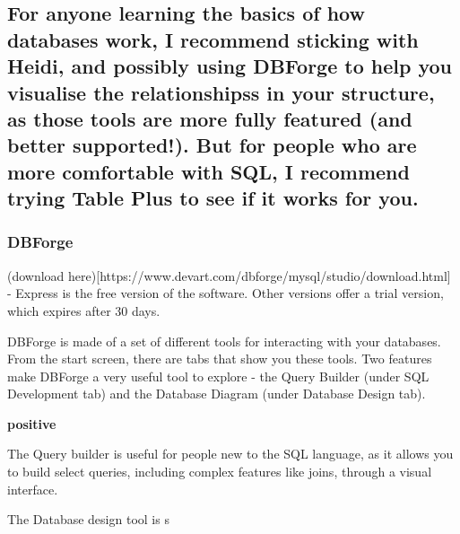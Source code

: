 \documentclass[]{article}
\begin{document}
\hypertarget{for-anyone-learning-the-basics-of-how-databases-work-i-recommend-sticking-with-heidi-and-possibly-using-dbforge-to-help-you-visualise-the-relationshipss-in-your-structure-as-those-tools-are-more-fully-featured-and-better-supported.-but-for-people-who-are-more-comfortable-with-sql-i-recommend-trying-table-plus-to-see-if-it-works-for-you.}{%
\subsection{For anyone learning the basics of how databases work, I
recommend sticking with Heidi, and possibly using DBForge to help you
visualise the relationshipss in your structure, as those tools are more
fully featured (and better supported!). But for people who are more
comfortable with SQL, I recommend trying Table Plus to see if it works
for
you.}\label{for-anyone-learning-the-basics-of-how-databases-work-i-recommend-sticking-with-heidi-and-possibly-using-dbforge-to-help-you-visualise-the-relationshipss-in-your-structure-as-those-tools-are-more-fully-featured-and-better-supported.-but-for-people-who-are-more-comfortable-with-sql-i-recommend-trying-table-plus-to-see-if-it-works-for-you.}}

\hypertarget{dbforge}{%
\subsubsection{DBForge}\label{dbforge}}

(download
here){[}https://www.devart.com/dbforge/mysql/studio/download.html{]} -
Express is the free version of the software. Other versions offer a
trial version, which expires after 30 days.

DBForge is made of a set of different tools for interacting with your
databases. From the start screen, there are tabs that show you these
tools. Two features make DBForge a very useful tool to explore - the
Query Builder (under SQL Development tab) and the Database Diagram
(under Database Design tab).

\textbf{positive}

The Query builder is useful for people new to the SQL language, as it
allows you to build select queries, including complex features like
joins, through a visual interface.

The Database design tool is s
\end{document}
